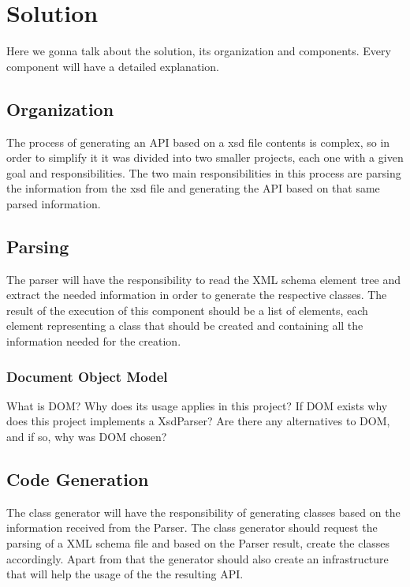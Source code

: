 \chapter{Solution}
\label{cha:solution}

Here we gonna talk about the solution, its organization and components. Every component will have a detailed explanation.

\section{Organization} %
\label{sec:organization}

The process of generating an API based on a xsd file contents is complex, so in order to simplify it it was divided into two smaller projects, each one with a given goal and responsibilities. The two main responsibilities in this process are parsing the information from the xsd file and generating the API based on that same parsed information.

\section{Parsing} %
\label{sec:parsing}


The parser will have the responsibility to read the XML schema element tree and extract the needed information in order to generate the respective classes. The result of the execution of this component should be a list of elements, each element representing a class that should be created and containing all the information needed for the creation.

\subsection{Document Object Model} %
\label{sec:dom}

What is DOM? Why does its usage applies in this project? If DOM exists why does this project implements a XsdParser? Are there any alternatives to DOM, and if so, why was DOM chosen?

\section{Code Generation} %
\label{sec:codegeneration}


The class generator will have the responsibility of generating classes based on the information received from the Parser. The class generator should request the parsing of a XML schema file and based on the Parser result, create the classes accordingly. Apart from that the generator should also create an infrastructure that will help the usage of the the resulting API. 


